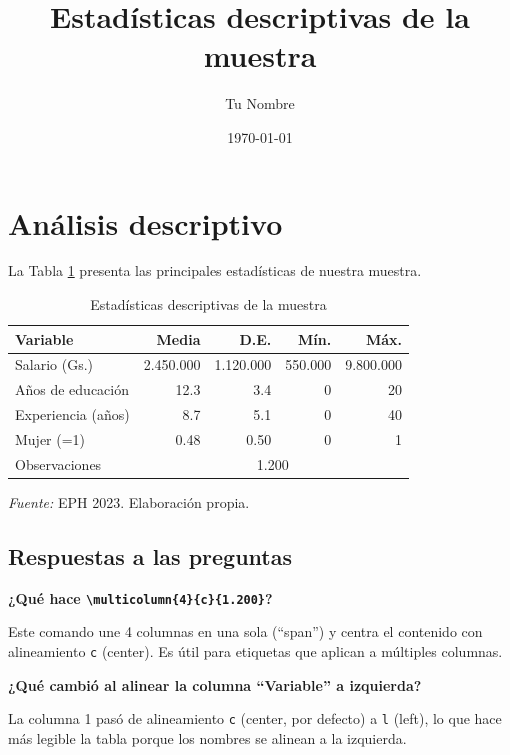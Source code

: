 \documentclass[12pt, a4paper]{article}
\title{Estadísticas descriptivas de la muestra}
\author{Tu Nombre}
\date{\today}
\begin{document}
\maketitle

\section{Análisis descriptivo}

La Tabla \ref{tab:descriptivas} presenta las principales estadísticas de 
nuestra muestra.

\begin{table}[htbp]
  \centering
  \caption{Estadísticas descriptivas de la muestra}
  \label{tab:descriptivas}
  \begin{tabular}{lrrrr}
    \toprule
    Variable       & Media  & D.E.  & Mín.  & Máx.  \\
    \midrule
    Salario (Gs.) & 2.450.000 & 1.120.000 & 550.000 & 9.800.000 \\
    Años de educación & 12.3 & 3.4  & 0     & 20    \\
    Experiencia (años) & 8.7 & 5.1  & 0     & 40    \\
    Mujer (=1)    & 0.48  & 0.50  & 0     & 1     \\
    \midrule
    Observaciones & \multicolumn{4}{c}{1.200} \\
    \bottomrule
  \end{tabular}
  \begin{minipage}{\linewidth}
    \footnotesize \textit{Fuente:} EPH 2023. Elaboración propia.
  \end{minipage}
\end{table}

\subsection*{Respuestas a las preguntas}

\textbf{¿Qué hace \texttt{\textbackslash multicolumn\{4\}\{c\}\{1.200\}}?}

Este comando une 4 columnas en una sola (``span'') y centra el contenido 
con alineamiento \texttt{c} (center). Es útil para etiquetas que aplican 
a múltiples columnas.

\textbf{¿Qué cambió al alinear la columna ``Variable'' a izquierda?}

La columna 1 pasó de alineamiento \texttt{c} (center, por defecto) a 
\texttt{l} (left), lo que hace más legible la tabla porque los nombres 
se alinean a la izquierda.
\end{document}
